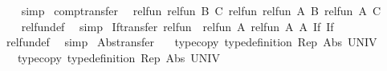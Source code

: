\begin{isabellebody}
%
\isadelimproof
\ \ %
\endisadelimproof
%
\isatagproof
{}\isamarkupfalse%
\ simp%
\endisatagproof
{\isafoldproof}%
%
\isadelimproof
\isanewline
%
\endisadelimproof
\isanewline
{}\isamarkupfalse%
\ comp{\isacharunderscore}{\kern0pt}transfer{\isacharcolon}{\kern0pt}\isanewline
\ \ {\isachardoublequoteopen}rel{\isacharunderscore}{\kern0pt}fun\ {\isacharparenleft}{\kern0pt}rel{\isacharunderscore}{\kern0pt}fun\ B\ C{\isacharparenright}{\kern0pt}\ {\isacharparenleft}{\kern0pt}rel{\isacharunderscore}{\kern0pt}fun\ {\isacharparenleft}{\kern0pt}rel{\isacharunderscore}{\kern0pt}fun\ A\ B{\isacharparenright}{\kern0pt}\ {\isacharparenleft}{\kern0pt}rel{\isacharunderscore}{\kern0pt}fun\ A\ C{\isacharparenright}{\kern0pt}{\isacharparenright}{\kern0pt}\ {\isacharparenleft}{\kern0pt}{\isasymcirc}{\isacharparenright}{\kern0pt}\ {\isacharparenleft}{\kern0pt}{\isasymcirc}{\isacharparenright}{\kern0pt}{\isachardoublequoteclose}\isanewline
%
\isadelimproof
\ \ %
\endisadelimproof
%
\isatagproof
{}\isamarkupfalse%
\ rel{\isacharunderscore}{\kern0pt}fun{\isacharunderscore}{\kern0pt}def\ \isamarkupfalse%
\ simp%
\endisatagproof
{\isafoldproof}%
%
\isadelimproof
\isanewline
%
\endisadelimproof
\isanewline
{}\isamarkupfalse%
\ If{\isacharunderscore}{\kern0pt}transfer{\isacharcolon}{\kern0pt}\ {\isachardoublequoteopen}rel{\isacharunderscore}{\kern0pt}fun\ {\isacharparenleft}{\kern0pt}{\isacharequal}{\kern0pt}{\isacharparenright}{\kern0pt}\ {\isacharparenleft}{\kern0pt}rel{\isacharunderscore}{\kern0pt}fun\ A\ {\isacharparenleft}{\kern0pt}rel{\isacharunderscore}{\kern0pt}fun\ A\ A{\isacharparenright}{\kern0pt}{\isacharparenright}{\kern0pt}\ If\ If{\isachardoublequoteclose}\isanewline
%
\isadelimproof
\ \ %
\endisadelimproof
%
\isatagproof
{}\isamarkupfalse%
\ rel{\isacharunderscore}{\kern0pt}fun{\isacharunderscore}{\kern0pt}def\ \isamarkupfalse%
\ simp%
\endisatagproof
{\isafoldproof}%
%
\isadelimproof
\isanewline
%
\endisadelimproof
\isanewline
{}\isamarkupfalse%
\ Abs{\isacharunderscore}{\kern0pt}transfer{\isacharcolon}{\kern0pt}\isanewline
\ \ \ type{\isacharunderscore}{\kern0pt}copy{}{\isacharcolon}{\kern0pt}\ {\isachardoublequoteopen}type{\isacharunderscore}{\kern0pt}definition\ Rep{}\ Abs{}\ UNIV{\isachardoublequoteclose}\isanewline
\ \ \ type{\isacharunderscore}{\kern0pt}copy{}{\isacharcolon}{\kern0pt}\ {\isachardoublequoteopen}type{\isacharunderscore}{\kern0pt}definition\ Rep{}\ Abs{}\ UNIV{\isachardoublequoteclose}\isanewline

\end{isabellebody}
